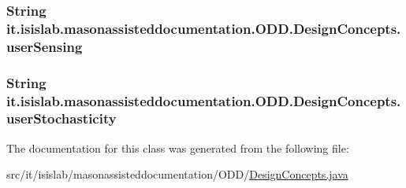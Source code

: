 \hypertarget{classit_1_1isislab_1_1masonassisteddocumentation_1_1_o_d_d_1_1_design_concepts_afdf07a1a17b9a504ae945b043360205d}{
\subsubsection[{user\-Sensing}]{\setlength{\rightskip}{0pt plus 5cm}String it.\-isislab.\-masonassisteddocumentation.\-O\-D\-D.\-Design\-Concepts.\-user\-Sensing\hspace{0.3cm}{\ttfamily [package]}}}\label{classit_1_1isislab_1_1masonassisteddocumentation_1_1_o_d_d_1_1_design_concepts_afdf07a1a17b9a504ae945b043360205d}
\hypertarget{classit_1_1isislab_1_1masonassisteddocumentation_1_1_o_d_d_1_1_design_concepts_af02ba7c14181c59c2f37d95bba539e2a}{
\subsubsection[{user\-Stochasticity}]{\setlength{\rightskip}{0pt plus 5cm}String it.\-isislab.\-masonassisteddocumentation.\-O\-D\-D.\-Design\-Concepts.\-user\-Stochasticity\hspace{0.3cm}{\ttfamily [package]}}}\label{classit_1_1isislab_1_1masonassisteddocumentation_1_1_o_d_d_1_1_design_concepts_af02ba7c14181c59c2f37d95bba539e2a}


The documentation for this class was generated from the following file\-:\begin{DoxyCompactItemize}
\item 
src/it/isislab/masonassisteddocumentation/\-O\-D\-D/\hyperlink{_design_concepts_8java}{Design\-Concepts.\-java}\end{DoxyCompactItemize}
